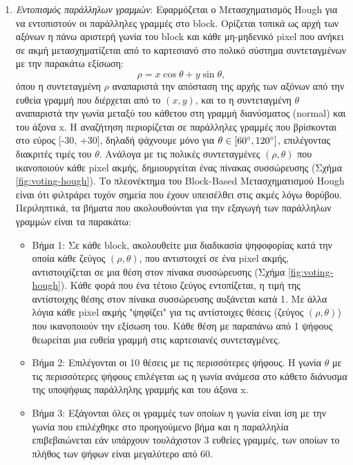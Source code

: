 \begin{enumerate}[1)]
    \item \emph{Εντοπισμός παράλληλων γραμμών}: Εφαρμόζεται ο Μετασχηματισμός Hough για να εντοπιστούν οι παράλληλες γραμμές στο block. Ορίζεται τοπικά ως αρχή των αξόνων η πάνω αριστερή γωνία του block και κάθε μη-μηδενικό pixel που ανήκει σε ακμή μετασχηματίζεται από το καρτεσιανό στο πολικό σύστημα συντεταγμένων με την παρακάτω εξίσωση:$$\rho = x\cos{\theta}+y\sin{\theta},$$ όπου η συντεταγμένη $\rho$ αναπαριστά την απόσταση της αρχής των αξόνων από την ευθεία γραμμή που διέρχεται από το $(x,y)$, και το η συντεταγμένη $\theta$ αναπαριστά την γωνία μεταξύ του κάθετου στη γραμμή διανύσματος (normal) και του άξονα x. Η αναζήτηση περιορίζεται σε παράλληλες γραμμές που βρίσκονται στο εύρος [-30\degree, +30\degree], δηλαδή ψάχνουμε μόνο για $\theta \in [60\degree,120\degree]$, επιλέγοντας διακριτές τιμές του $\theta$. Ανάλογα με τις πολικές συντεταγμένες $(\rho,\theta)$ που ικανοποιούν κάθε pixel ακμής, δημιουργείται ένας πίνακας συσσώρευσης (Σχήμα \ref{fig:voting-hough}). Το πλεονέκτημα του Block-Based Μετασχηματισμού Hough είναι ότι φιλτράρει τυχόν σημεία που έχουν υπεισέλθει στις ακμές λόγω θορύβου. Περιληπτικά, τα βήματα που ακολουθούνται για την εξαγωγή των παράλληλων γραμμών είναι τα παρακάτω:
    \begin{itemize}
        \item Βήμα 1: Σε κάθε block, ακολουθείτε μια διαδικασία ψηφοφορίας κατά την οποία κάθε ζεύγος $(\rho,\theta)$, που αντιστοιχεί σε ένα pixel ακμής, αντιστοιχίζεται σε μια θέση στον πίνακα συσσώρευσης (Σχήμα \ref{fig:voting-hough}). Κάθε φορά που ένα τέτοιο ζεύγος εντοπίζεται, η τιμή της αντίστοιχης θέσης στον πίνακα συσσώρευσης αυξάνεται κατά 1. Με άλλα λόγια κάθε pixel ακμής "ψηφίζει" για τις αντίστοιχες θέσεις (ζεύγος $(\rho,\theta)$) που ικανοποιούν την εξίσωση του. Κάθε θέση με παραπάνω από 1 ψήφους θεωρείται μια ευθεία γραμμή στις καρτεσιανές συντεταγμένες.
        \item Βήμα 2: Επιλέγονται οι 10 θέσεις με τις περισσότερες ψήφους. Η γωνία $\theta$ με τις περισσότερες ψήφους επιλέγεται ως η γωνία ανάμεσα στο κάθετο διάνυσμα της υποψήφιας παράλληλης γραμμής και του άξονα x.
        \item Βήμα 3: Εξάγονται όλες οι γραμμές των οποίων η γωνία είναι ίση με την γωνία που επιλέχθηκε στο προηγούμενο βήμα και η παραλληλία επιβεβαιώνεται εάν υπάρχουν τουλάχιστον 3 ευθείες γραμμές, των οποίων το πλήθος των ψήφων είναι μεγαλύτερο από 60.
    \end{itemize}
\end{enumerate}
